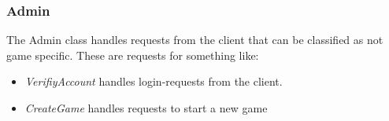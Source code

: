 \subsubsection{Admin}
\label{sec:adminimpl}
The Admin class handles requests from the client that can be classified as not game specific. These are requests for something like:
\begin{itemize}
\item \textit{VerifiyAccount} handles login-requests from the client.
\item \textit{CreateGame} handles requests to start a new game
\end{itemize}

